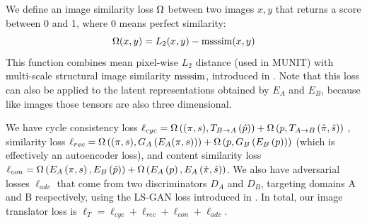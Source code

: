 \documentclass{article}
\begin{document}
		
		We define an image similarity loss $\Omega$ between two images $x,y$ that returns a score between 0 and 1, where 0 means perfect similarity:
		\begin{equation}
			\Omega(x,y) = L_2(x,y)-\text{msssim}(x,y) 
		\end{equation}
		This function combines mean pixel-wise $L_2$ distance (used in MUNIT) with multi-scale structural image similarity $\text{msssim}$, introduced in \citep{msssim}. Note that this loss can also be applied to the latent representations obtained by $E_A$ and $E_B$, because like images those tensors are also three dimensional.



		We have cycle consistency loss ${\ell_{cyc}  =  \Omega\left((\pi,s),T_{B\rightarrow A}\left(\hat{p}\right)\right)  +  \Omega\left(p,T_{A\rightarrow B}\left(\hat{\pi},\hat{s}\right)\right)}$
		, similarity loss ${\ell_{rec} = \Omega\left((\pi,s),G_A\left(E_A(\pi,s)\right)\right) + \Omega\left(p,G_B\left(E_B\left(p\right)\right)\right)}$
			(which is effectively an autoencoder loss),   
		and content similarity loss ${ \ell_{con} = \Omega\left(E_A\left(\pi,s\right), E_B\left(\hat{p}\right) \right)    +   \Omega\left(E_A\left(p\right),E_A\left(\hat{\pi},\hat{s}\right)\right) }$.
		We also have adversarial losses $\ell_{adv}$ that come from two discriminators $D_A$ and $D_B$, targeting domains A and B respectively, using the LS-GAN loss introduced in \citet{lsgan}. 
		In total, our image translator loss is $\ell_T=\ell_{cyc}+\ell_{rec}+\ell_{con}+\ell_{adv}$.
\end{document}
